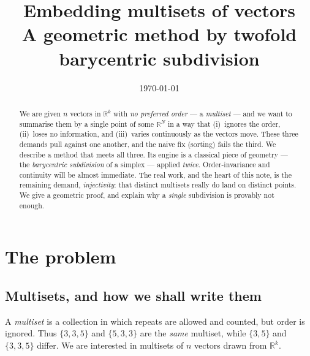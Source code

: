 \documentclass[11pt,a4paper]{article}
\title{\bfseries Embedding multisets of vectors\\[2pt]
       \large A geometric method by twofold barycentric subdivision}
\author{}
\date{\today}
\theoremstyle{definition}
\theoremstyle{plain}
\newcommand{\R}{\mathbb{R}}
\begin{document}
\maketitle

\begin{abstract}
\noindent
We are given $n$ vectors in $\R^k$ with \emph{no preferred order} --- a
\emph{multiset} --- and we want to summarise them by a single point of some
$\R^N$ in a way that (i)~ignores the order, (ii)~loses no information, and
(iii)~varies continuously as the vectors move.  These three demands pull
against one another, and the naive fix (sorting) fails the third.  We describe a
method that meets all three.  Its engine is a classical piece of geometry ---
the \emph{barycentric subdivision} of a simplex --- applied \emph{twice}.
Order-invariance and continuity will be almost immediate.  The real work, and the
heart of this note, is the remaining demand, \emph{injectivity}: that distinct
multisets really do land on distinct points.  We give a geometric proof, and explain why a
\emph{single} subdivision is provably not enough.
\end{abstract}

\tableofcontents
\bigskip

\section{The problem}
\label{sec:problem}

\subsection{Multisets, and how we shall write them}

A \emph{multiset} is a collection in which repeats are allowed and counted, but
order is ignored.  Thus $\{3,3,5\}$ and $\{5,3,3\}$ are the \emph{same}
multiset, while $\{3,5\}$ and $\{3,3,5\}$ differ.  We are interested in
multisets of $n$ vectors drawn from $\R^k$.
\end{document}
